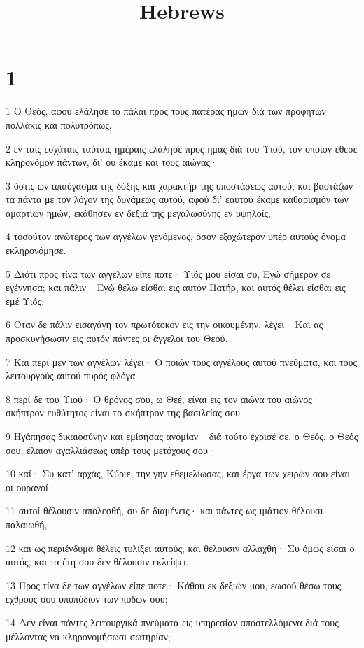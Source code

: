 

\title{Hebrews}


\chapter{1}

\par 1 Ο Θεός, αφού ελάλησε το πάλαι προς τους πατέρας ημών διά των προφητών πολλάκις και πολυτρόπως,
\par 2 εν ταις εσχάταις ταύταις ημέραις ελάλησε προς ημάς διά του Υιού, τον οποίον έθεσε κληρονόμον πάντων, δι' ου έκαμε και τους αιώνας·
\par 3 όστις ων απαύγασμα της δόξης και χαρακτήρ της υποστάσεως αυτού, και βαστάζων τα πάντα με τον λόγον της δυνάμεως αυτού, αφού δι' εαυτού έκαμε καθαρισμόν των αμαρτιών ημών, εκάθησεν εν δεξιά της μεγαλωσύνης εν υψηλοίς,
\par 4 τοσούτον ανώτερος των αγγέλων γενόμενος, όσον εξοχώτερον υπέρ αυτούς όνομα εκληρονόμησε.
\par 5 Διότι προς τίνα των αγγέλων είπε ποτε· Υιός μου είσαι συ, Εγώ σήμερον σε εγέννησα; και πάλιν· Εγώ θέλω είσθαι εις αυτόν Πατήρ, και αυτός θέλει είσθαι εις εμέ Υιός;
\par 6 Όταν δε πάλιν εισαγάγη τον πρωτότοκον εις την οικουμένην, λέγει· Και ας προσκυνήσωσιν εις αυτόν πάντες οι άγγελοι του Θεού.
\par 7 Και περί μεν των αγγέλων λέγει· Ο ποιών τους αγγέλους αυτού πνεύματα, και τους λειτουργούς αυτού πυρός φλόγα·
\par 8 περί δε του Υιού· Ο θρόνος σου, ω Θεέ, είναι εις τον αιώνα του αιώνος· σκήπτρον ευθύτητος είναι το σκήπτρον της βασιλείας σου.
\par 9 Ηγάπησας δικαιοσύνην και εμίσησας ανομίαν· διά τούτο έχρισέ σε, ο Θεός, ο Θεός σου, έλαιον αγαλλιάσεως υπέρ τους μετόχους σου·
\par 10 καί· Συ κατ' αρχάς, Κύριε, την γην εθεμελίωσας, και έργα των χειρών σου είναι οι ουρανοί·
\par 11 αυτοί θέλουσιν απολεσθή, συ δε διαμένεις· και πάντες ως ιμάτιον θέλουσι παλαιωθή,
\par 12 και ως περιένδυμα θέλεις τυλίξει αυτούς, και θέλουσιν αλλαχθή· Συ όμως είσαι ο αυτός, και τα έτη σου δεν θέλουσιν εκλείψει.
\par 13 Προς τίνα δε των αγγέλων είπε ποτε· Κάθου εκ δεξιών μου, εωσού θέσω τους εχθρούς σου υποπόδιον των ποδών σου;
\par 14 Δεν είναι πάντες λειτουργικά πνεύματα εις υπηρεσίαν αποστελλόμενα διά τους μέλλοντας να κληρονομήσωσι σωτηρίαν;

